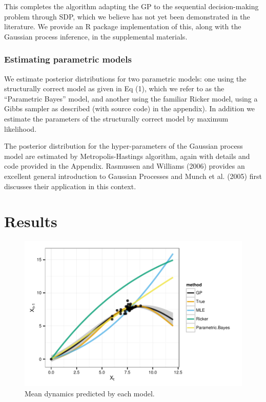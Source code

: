 \documentclass[author-year, review]{elsarticle} %
\makeatletter
\def\maxwidth{\ifdim\Gin@nat@width>\linewidth\linewidth
\else\Gin@nat@width\fi}
\let\Oldincludegraphics\includegraphics
\renewcommand{\includegraphics}[1]{\Oldincludegraphics[width=\maxwidth]{#1}}
\makeatother
\begin{document}
This completes the algorithm adapting the GP to the sequential
decision-making problem through SDP, which we believe has not yet been
demonstrated in the literature. We provide an R package implementation
of this, along with the Gaussian process inference, in the supplemental
materials.

\subsubsection{Estimating parametric models}

We estimate posterior distributions for two parametric models: one using
the structurally correct model as given in Eq (1), which we refer to as
the ``Parametric Bayes'' model, and another using the familiar Ricker
model, using a Gibbs sampler as described (with source code) in the
appendix). In addition we estimate the parameters of the structurally
correct model by maximum likelihood.

The posterior distribution for the hyper-parameters of the Gaussian
process model are estimated by Metropolis-Hastings algorithm, again with
details and code provided in the Appendix. Rasmussen and Williams (2006)
provides an excellent general introduction to Gaussian Processes and
Munch et al. (2005) first discusses their application in this context.

\section{Results}

\begin{figure}[htbp]
\centering
\includegraphics{Figure1.pdf}
\caption{Mean dynamics predicted by each model.}
\end{figure}
\end{document}
